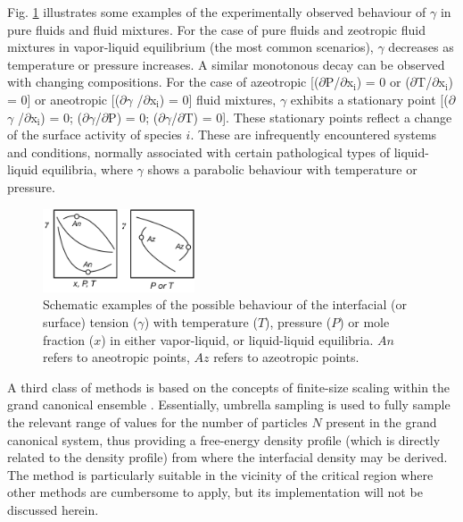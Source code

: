 \documentclass[9pt,bestpractices]{livecoms}
\begin{document}
Fig. \ref{fig:3} illustrates some examples of the experimentally observed behaviour of
$\gamma$ in pure fluids and fluid mixtures. For the case of pure fluids and
zeotropic fluid mixtures in vapor-liquid equilibrium (the most common
scenarios), {${\gamma}$} decreases as temperature or pressure increases.
A similar monotonous decay can be observed with changing compositions. For the
case of azeotropic [(${\partial}$P/${\partial}$x$_{\mathrm{i}}$) = 0 or
(${\partial}$T/${\partial}$x$_{\mathrm{i}}$) = 0] or aneotropic
[(${\partial}${${\gamma}$} /${\partial}$x$_{\mathrm{i}}$) = 0] fluid mixtures,
{${\gamma}$} exhibits a stationary point [(${\partial}${${\gamma}$}
/${\partial}$x$_{\mathrm{i}}$) = 0; (${\partial}${${\gamma}$}/${\partial}$P)
= 0; (${\partial}${${\gamma}$}/${\partial}$T) = 0]. These stationary points
reflect a change of the surface activity of species $i$. These are
infrequently encountered systems and conditions, normally associated with
certain pathological types of liquid-liquid equilibria, where {${\gamma}$} shows a parabolic
behaviour with temperature or pressure.
\begin{figure}
  \centering
  \includegraphics[width=0.4\textwidth]{gfx/image7.png}
  \caption{Schematic examples of the possible behaviour of the interfacial (or surface) tension ({${\gamma}$}) with temperature ($T$), pressure ($P$) or mole fraction ($x$) in either vapor-liquid, or liquid-liquid equilibria. $An$ refers to aneotropic points, $Az$ refers to azeotropic points.}
  \label{fig:3}
\end{figure}

A third class of methods is based on the
concepts of finite-size scaling within the grand canonical ensemble 
\citep{binder1982,errington2003}. Essentially, umbrella
sampling is used to fully sample the relevant range of values for the number of
particles $N$ present in the grand canonical system, thus providing a free-energy
density profile (which is directly related to the density profile) from where
the interfacial density may be derived. The method is particularly suitable in the vicinity of
the critical region where other methods are cumbersome to apply, but its
implementation \cite{allen2017,schrader2009} will not be discussed
herein.
\end{document}
